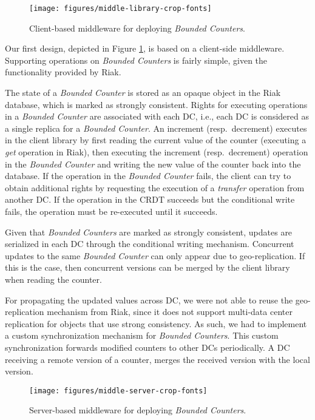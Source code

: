 \documentclass[conference]{IEEEtran}
\newcommand{\InvCounter}{\emph{Bounded Counter}}
\newcommand{\InvCounters}{\emph{Bounded Counters}}
\begin{document}
\begin{figure}
\texttt{[image: figures/middle-library-crop-fonts]}
\vspace{-2ex}
\caption{Client-based middleware for deploying \InvCounters{}.}\label{fig:middle:library}
\end{figure}


Our first design, depicted in Figure \ref{fig:middle:library}, is based on a client-side middleware.
Supporting operations on \InvCounters{} is fairly simple, given the functionality provided by Riak.

The state of a \InvCounter{} is stored as an opaque object in the Riak database, which
is marked as strongly consistent.
Rights for executing operations in a \InvCounter{} are associated with each DC, i.e., 
each DC is considered as a single replica for a \InvCounter{}. 
An increment (resp.\ decrement) executes in the client library by first reading 
the current value of the counter (executing a \emph{get} operation in Riak), 
then executing the increment (resp.\ decrement) operation in the \InvCounter{} 
and writing the new value of the counter back into the database. 
If the operation in the \InvCounter{} fails, the client can try to obtain additional 
rights by requesting the execution of a \emph{transfer} operation from another DC. 
If the operation in the CRDT succeeds but the conditional write fails, the operation 
must be re-executed until it succeeds. 

Given that \InvCounters{} are marked as strongly consistent, updates are serialized 
in each DC through the conditional writing mechanism.
Concurrent updates to the same \InvCounter{} can only 
appear due to geo-replication. 
If this is the case, then concurrent versions can be merged by the client 
library when reading the counter.

For propagating the updated values across DC, we were not able to reuse 
the geo-replication mechanism from Riak, since it does not support multi-data 
center replication for objects that use strong consistency. 
As such, we had to implement a custom synchronization mechanism for 
\InvCounters{}.
This custom synchronization forwards modified counters to other DCs periodically.
A DC receiving a remote version of a counter, merges the received version with 
the local version. 

\begin{figure}
\texttt{[image: figures/middle-server-crop-fonts]}
\vspace{-2ex}
\caption{Server-based middleware for deploying \InvCounters{}.}\label{fig:middle-server}
\vspace{-2ex}
\end{figure}
\end{document}
